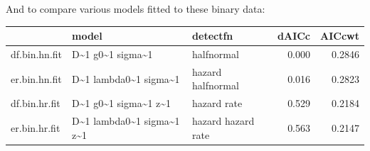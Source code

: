 And to compare various models fitted to these binary data:
{\small
\begin{knitrout}
\color{fgcolor}\begin{kframe}
\begin{alltt}
 \hlkwb{=} 
\hlopt{::}\hlstd{(aics[,}\hlstd{(}\hlstd{,}\hlstd{,}\hlstd{,}\hlstd{)])}
\end{alltt}
\end{kframe}
\begin{tabular}{l|l|l|r|r}
\hline
  & model & detectfn & dAICc & AICcwt\\
\hline
df.bin.hn.fit & D\textasciitilde{}1 g0\textasciitilde{}1 sigma\textasciitilde{}1 & halfnormal & 0.000 & 0.2846\\
\hline
er.bin.hn.fit & D\textasciitilde{}1 lambda0\textasciitilde{}1 sigma\textasciitilde{}1 & hazard halfnormal & 0.016 & 0.2823\\
\hline
df.bin.hr.fit & D\textasciitilde{}1 g0\textasciitilde{}1 sigma\textasciitilde{}1 z\textasciitilde{}1 & hazard rate & 0.529 & 0.2184\\
\hline
er.bin.hr.fit & D\textasciitilde{}1 lambda0\textasciitilde{}1 sigma\textasciitilde{}1 z\textasciitilde{}1 & hazard hazard rate & 0.563 & 0.2147\\
\hline
\end{tabular}


\end{knitrout}
}



